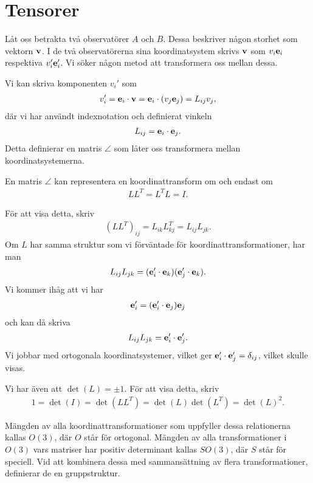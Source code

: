 \section{Tensorer}

Låt oss betrakta två observatörer $A$ och $B$. Dessa beskriver någon storhet som vektorn $\vb{v}$. I de två observatörerna sina koordinatsystem skrivs $\vb{v}$ som $v_i\vb{e}_{i}$ respektiva $v_i'\vb{e}_{i}'$. Vi söker någon metod att transformera oss mellan dessa.

Vi kan skriva komponenten $v_i'$ som
\begin{align*}
	v_i' = \vb{e}_{i}\cdot\vb{v} = \vb{e}_{i}\cdot (v_j\vb{e}_{j}) = L_{ij}v_{j},
\end{align*}
där vi har användt indexnotation och definierat vinkeln
\begin{align*}
	L_{ij} = \vb{e}_{i}\cdot\vb{e}_{j}.
\end{align*}
Detta definierar en matris $\angle$ som låter oss transformera mellan koordinatsystemerna.

En matris $\angle$ kan representera en koordinattransform om och endast om
\begin{align*}
	LL^{T} = L^{T}L = I.
\end{align*}

För att visa detta, skriv
\begin{align*}
	(LL^{T})_{ij} = L_{ik}L^{T}_{kj} = L_{ij}L_{jk}.
\end{align*}
Om $L$ har samma struktur som vi förväntade för koordinattransformationer, har man
\begin{align*}
	L_{ij}L_{jk} = (\vb{e}_{i}'\cdot\vb{e}_{k})(\vb{e}_{j}'\cdot\vb{e}_{k}).
\end{align*}
Vi kommer ihåg att vi har
\begin{align*}
	\vb{e}_{i}' = (\vb{e}_{i}'\cdot\vb{e}_{j})\vb{e}_{j}
\end{align*}
och kan då skriva
\begin{align*}
	L_{ij}L_{jk} = \vb{e}_{i}'\cdot\vb{e}_{j}'.
\end{align*}
Vi jobbar med ortogonala koordinatsystemer, vilket ger $\vb{e}_{i}'\cdot\vb{e}_{j}' = \delta_{ij}$, vilket skulle visas.

Vi har även att $\det (L) = \pm 1$. För att visa detta, skriv
\begin{align*}
	1 = \det (I) = \det (LL^{T}) = \det (L)\det (L^{T}) = \det (L)^2.
\end{align*}

Mängden av alla koordinattransformationer som uppfyller dessa relationerna kallas $O(3)$, där $O$ står för ortogonal. Mängden av alla transformationer i $O(3)$ vars matriser har positiv determinant kallas $SO(3)$, där $S$ står för speciell. Vid att kombinera dessa med sammansättning av flera transformationer, definierar de en gruppstruktur. 


